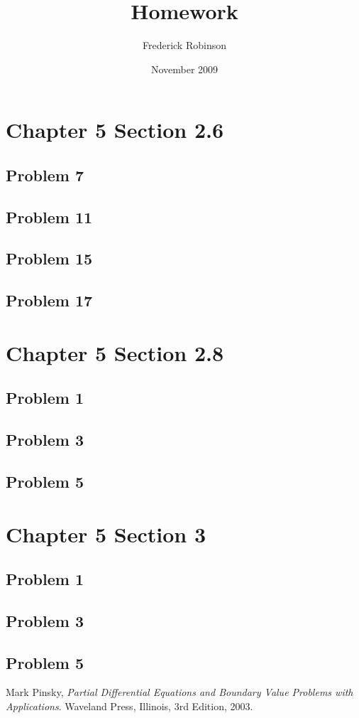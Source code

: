 \documentclass[12pt]{article}
\title{Homework}
\author{Frederick Robinson}
\date{November 2009}
\begin{document}

   \maketitle

\setcounter{tocdepth}{2} 

\tableofcontents

\section{Chapter 5 Section 2.6}

\subsection{Problem 7}
\subsection{Problem 11}
\subsection{Problem 15}
\subsection{Problem 17}


\section{Chapter 5 Section 2.8}

\subsection{Problem 1}
\subsection{Problem 3}
\subsection{Problem 5}

\section{Chapter 5 Section 3}

\subsection{Problem 1}
\subsection{Problem 3}
\subsection{Problem 5}

\begin{thebibliography}{9}

	  Mark Pinsky,
	  \emph{Partial Differential Equations and Boundary Value Problems with Applications}.
	  Waveland Press, Illinois,
	  3rd Edition,
	  2003.

\end{thebibliography}
\end{document}
